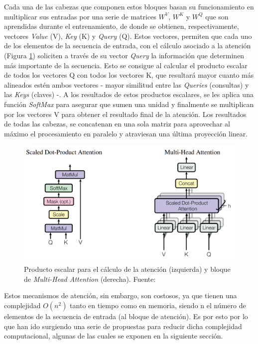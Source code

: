 Cada una de las cabezas que componen estos bloques basan su funcionamiento en multiplicar sus entradas por una serie de matrices $W^V$, $W^K$ y $W^Q$ que son aprendidas durante el entrenamiento, de donde se obtienen, respectivamente, vectores \textit{Value} (V), \textit{Key} (K) y \textit{Query} (Q). Estos vectores, permiten que cada uno de los elementos de la secuencia de entrada, con el cálculo asociado a la atención (Figura \ref{fig:multi-head-attention}) soliciten a través de su vector \textit{Query} la información que determinen más importante de la secuencia. Esto se consigue al calcular el producto escalar de todos los vectores Q con todos los vectores K, que resultará mayor cuanto más alineados estén ambos vectores - mayor similitud entre las \textit{Queries} (consultas) y las \textit{Keys} (claves) -. A los resultados de estos productos escalares, se les aplica una función \textit{SoftMax} para asegurar que sumen una unidad y finalmente se multiplican por los vectores V para obtener el resultado final de la atención. Los resultados de todas las cabezas, se concatenan en una sola matriz para aprovechar al máximo el procesamiento en paralelo y atraviesan una última proyección linear.
\begin{figure}[H]
\centering
\includegraphics[width=0.65\linewidth]{imagenes/multi-head-attention.png} 
\captionsetup{width=.8\linewidth}
\caption{Producto escalar para el cálculo de la atención (izquierda) y bloque de \textit{Multi-Head Attention} (derecha). Fuente: \cite{NIPS2017_3f5ee243}}
\label{fig:multi-head-attention}
\end{figure}

Estos mecanismos de atención, sin embargo, son costosos, ya que tienen una complejidad $O(n^{2})$ tanto en tiempo como en memoria, siendo n el número de elementos de la secuencia de entrada (al bloque de atención). Es por esto por lo que han ido surgiendo una serie de propuestas para reducir dicha complejidad computacional, algunas de las cuales se exponen en la siguiente sección.



